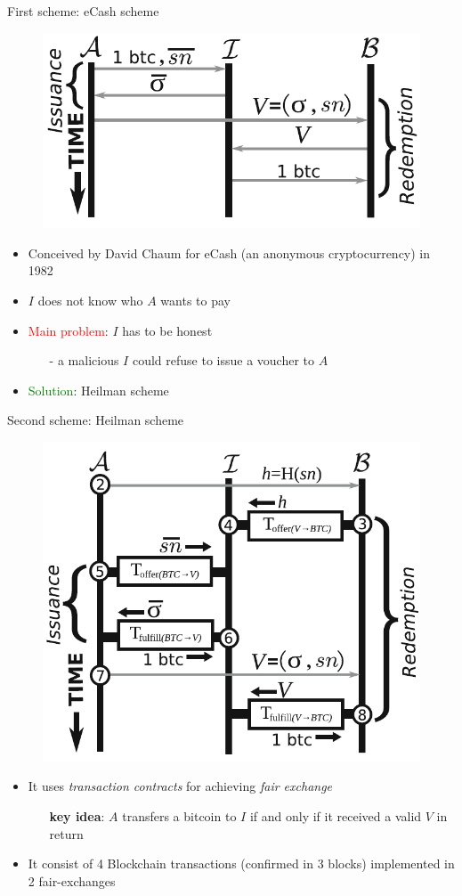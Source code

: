 \documentclass{beamer}
\newcommand\red[1]{\textcolor{red}{#1}}
\begin{document}
  \begin{frame}{First scheme: eCash scheme}
      \begin{figure}
          \centering
          \includegraphics[width=0.6\linewidth]{../img/eCash-scheme.png}
      \end{figure}
      \begin{itemize}
          \item Conceived by David Chaum for eCash (an anonymous cryptocurrency) in 1982 \cite{chaum1982blind}
          \item $I$ does not know who $A$ wants to pay \pause
          \item \red{Main problem}: $I$ has to be honest
          \begin{itemize}
              \item[-] a malicious $I$ could refuse to issue a voucher to $A$
          \end{itemize}
          \pause
          \item \textcolor{green}{Solution}: Heilman scheme \cite{heilman-blindly-signed-contracts}
      \end{itemize}
  \end{frame}
  
  
  
  
  \begin{frame}{Second scheme: Heilman scheme}
      \begin{figure}
          \centering
          \includegraphics[width=0.4\linewidth]{../img/heilman-scheme.png}
      \end{figure}
      \begin{itemize}
          \item It uses \emph{transaction contracts} for achieving \emph{fair exchange}
          \begin{itemize}
              \item[\MVRightarrow] \textbf{key idea}: $A$ transfers a bitcoin to $I$ if and only if it received a valid $V$ in return 
          \end{itemize}
          \item It consist of 4 Blockchain transactions (confirmed in 3 blocks) implemented in 2 fair-exchanges
      \end{itemize}
  \end{frame}
  
\end{document}

